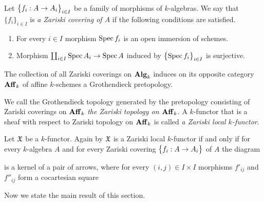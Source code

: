 \begin{definition}
Let $\big\{f_i:A\rightarrow A_i\big\}_{i\in I}$ be a family of morphisms of $k$-algebras. We say that $\{f_i\}_{i\in I}$ is \textit{a Zariski covering of $A$} if the following conditions are satisfied.
\begin{enumerate}[label=\textbf{(\arabic*)}, leftmargin=3.0em]
\item For every $i\in I$ morphism $\mathrm{Spec}\, f_i$ is an open immersion of schemes.
\item Morphism $\coprod_{i\in I}\mathrm{Spec}\, A_i\rightarrow \mathrm{Spec}\, A$ induced by $\big\{\mathrm{Spec}\, f_i\big\}_{i\in I}$ is surjective.
\end{enumerate}
\end{definition}
\noindent
The collection of all Zariski coverings on $\mathbf{Alg}_k$ induces on its opposite category $\mathbf{Aff}_k$ of affine $k$-schemes a Grothendieck pretopology.

\begin{definition}
We call the Grothendieck topology generated by the pretopology consisting of Zariski coverings on $\mathbf{Aff}_k$ \textit{the Zariski topology on $\mathbf{Aff}_k$}. A $k$-functor that is a sheaf with respect to Zariski topology on $\mathbf{Aff}_k$ is called \textit{a Zariski local $k$-functor}.
\end{definition}
\noindent
Let ${\mathfrak X}$ be a $k$-functor. Again by {\cite[Theorem 3.5]{Sheaves}} ${\mathfrak X}$ is a Zariski local $k$-functor if and only if for every $k$-algebra $A$ and for every Zariski covering $\big\{f_i:A\rightarrow A_i\big\}$ of $A$ the diagram
\begin{center}
\end{center}
is a kernel of a pair of arrows, where for every $(i,j)\in I\times I$ morphisms $f'_{ij}$ and $f''_{ij}$ form a cocartesian square
\begin{center}
\end{center}
\noindent
Now we state the main result of this section.

